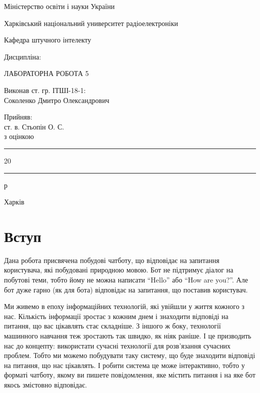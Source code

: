 \documentclass[a4paper,14pt]{extreport}
\newcommand\chap[1]{%
  \chapter*{#1}%
  \addcontentsline{toc}{chapter}{#1}}
\begin{document}
\begin{titlepage}
	\centering
    Міністерство освіти і науки України
    
    Харківський національний университет радіоелектроніки

    \vspace{1cm}
    Кафедра штучного інтелекту

    \vspace{2cm}
    Дисципліна: 

    \vspace{2cm}
    \uppercase{Лабораторна робота 5}

    
    \uppercase{}

    \vspace{4cm}
    \begin{minipage}[t]{10cm}
        Виконав ст. гр. ІТШІ-18-1:\\
        Соколенко Дмитро Олександрович
    \end{minipage}
    \hfill
    \begin{minipage}[t]{6cm}
        Прийняв:\\
        ст. в. Стьопін О. С.\\
        з оцінкою \say{\rule{2cm}{0.15mm}}\\
        \say{\rule{0.7cm}{0.15mm}}\rule{2cm}{0.15mm}20\rule{0.7cm}{0.15mm}р
    \end{minipage}

	\vfill

	{Харків \the\year{}}
\end{titlepage}

\tableofcontents
\newpage

\setcounter{page}{3}
\chap{Вступ}
    Дана робота присвячена побудові чатботу, що відповідає на запитання користувача, які побудовані природною мовою. Бот не підтримує діалог на побутові теми, тобто йому не можна написати ``Hello'' або ``How are you?''. Але бот дуже гарно (як для бота) відповідає на запитання, що поставив користувач.

    Ми живемо в епоху інформаційних технологій, які увійшли у життя кожного з нас. Кількість інформації зростає з кожним днем і знаходити відповіді на питання, що вас цікавлять стає складніше. З іншого ж боку, технології машинного навчання теж зростають так швидко, як ніяк раніше. І це призводить нас до концепту: використати сучасні технології для розв'язання сучасних проблем. Тобто ми можемо побудувати таку систему, що буде знаходити відповіді на питання, що нас цікавлять. І робити система це може інтерактивно, тобто у форматі чатботу, якому ви пишете повідомлення, яке містить питання і на яке бот якось змістовно відповідає.
\end{document}

